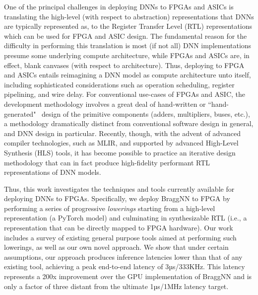 One of the principal challenges in deploying DNNs to FPGAs and ASICs is translating the high-level (with respect to abstraction) representations that DNNs are typically represented as, to the Register Transfer Level (RTL) representations which can be used for FPGA and ASIC design.
The fundamental reason for the difficulty in performing this translation is most (if not all) DNN implementations presume some underlying compute architecture, while FPGAs and ASICs are, in effect, blank canvases (with respect to architecture).
Thus, deploying to FPGA and ASICs entails reimagining a DNN model as compute architecture unto itself, including sophisticated considerations such as operation scheduling, register pipelining, and wire delay.
For conventional use-cases of FPGAs and ASIC, the development methodology involves a great deal of hand-written or ``hand-generated"~\cite{nikhil2004bluespec} design of the primitive components (adders, multipliers, buses, etc.), a methodology dramatically distinct from conventional software design in general, and DNN design in particular.
Recently, though, with the advent of advanced compiler technologies, such as MLIR, and supported by advanced High-Level Synthesis (HLS) tools, it has become possible to practice an iterative design methodology that can in fact produce high-fidelity performant RTL representations of DNN models.

Thus, this work investigates the techniques and tools currently available for deploying DNNs to FPGAs.
Specifically, we deploy BraggNN to FPGA by performing a series of progressive \emph{lowerings} starting from a high-level representation (a PyTorch model) and culminating in synthesizable RTL (i.e., a representation that can be directly mapped to FPGA hardware).
Our work includes a survey of existing general purpose tools aimed at performing such lowerings, as well as our own novel approach.
We show that under certain assumptions, our approach produces inference latencies lower than that of any  existing tool, achieving a peak end-to-end latency of 3µs/333KHz.
This latency represents a 200x improvement over the GPU implementation of BraggNN and is only a factor of three distant from the ultimate 1µs/1MHz latency target.


